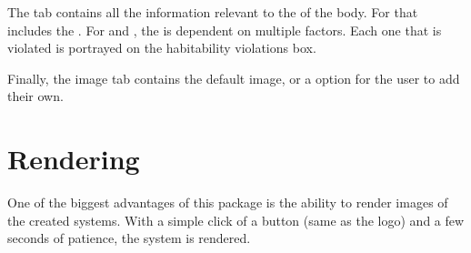 \documentclass[letterpaper,10pt,english]{sphinxmanual}
\begin{document}
\sphinxAtStartPar
The {\hyperref[\detokenize{quantities/habitability/habitability:id1}]{}} tab contains all the information relevant
to the {\hyperref[\detokenize{quantities/habitability/habitability:id1}]{}} of the body. For {\hyperref[\detokenize{celestial_bodies/star:id1}]{}} that includes
the {\hyperref[\detokenize{quantities/habitability/habitable_zones/habitable_zones:id1}]{}}.
For {\hyperref[\detokenize{celestial_bodies/planet:id1}]{}} and {\hyperref[\detokenize{celestial_bodies/satellite:id1}]{}},
the {\hyperref[\detokenize{quantities/habitability/habitability:id1}]{}} is dependent on multiple factors.
Each one that is violated is portrayed on the habitability violations box.

\sphinxAtStartPar
Finally, the image tab contains the default image, or a option for the user to add their own.


\section{Rendering}
\label{\detokenize{gui/gui:rendering}}
\sphinxAtStartPar
One of the biggest advantages of this package is the ability to render images of the
created systems. With a simple click of a button (same as the logo) and a few seconds
of patience, the system is rendered.
\end{document}
